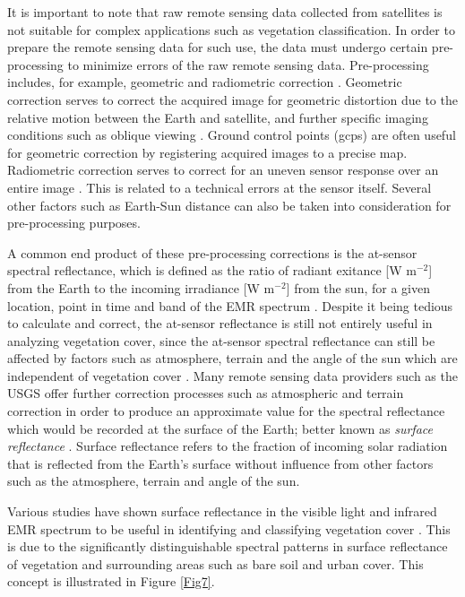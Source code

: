 \justify
It is important to note that raw remote sensing data collected from satellites is not suitable for complex applications such as vegetation classification. In order to prepare the remote sensing data for such use, the data must undergo certain pre-processing to minimize errors of the raw remote sensing data. Pre-processing includes, for example, geometric and radiometric correction \citep{lwin2008}. Geometric correction serves to correct the acquired image for geometric distortion due to the relative motion between the Earth and satellite, and further specific imaging conditions such as oblique viewing . Ground control points (\ac{gcp}s) are often useful for geometric correction by registering acquired images to a precise map. Radiometric correction serves to correct for an uneven sensor response over an entire image . This is related to a technical errors at the sensor itself. Several other factors such as Earth-Sun distance can also be taken into consideration for pre-processing purposes.

\justify
A common end product of these pre-processing corrections is the at-sensor spectral reflectance, which is defined as the ratio of radiant exitance [W m$^{-2}$] from the Earth to the incoming irradiance [W m$^{-2}$] from the sun, for a given location, point in time and band of the EMR spectrum \citep{sch2009}. Despite it being tedious to calculate and correct, the at-sensor reflectance is still not entirely useful in analyzing vegetation cover, since the at-sensor spectral reflectance can still be affected by factors such as atmosphere, terrain and the angle of the sun which are independent of vegetation cover \citep{lwin2008, landsat2009}. Many remote sensing data providers such as the USGS offer further correction processes such as atmospheric and terrain correction in order to produce an approximate value for the spectral reflectance which would be recorded at the surface of the Earth; better known as \textit{surface reflectance} \citep{landsat2009}. Surface reflectance refers to the fraction of incoming solar radiation that is reflected from the Earth's surface without influence from other factors such as the atmosphere, terrain and angle of the sun.

\justify
Various studies have shown surface reflectance in the visible light and infrared EMR spectrum to be useful in identifying and classifying vegetation cover \citep{lwin2008, SM2005}. This is due to the significantly distinguishable spectral patterns in surface reflectance of vegetation and surrounding areas such as bare soil and urban cover. This concept is illustrated in Figure \ref{Fig7}.

